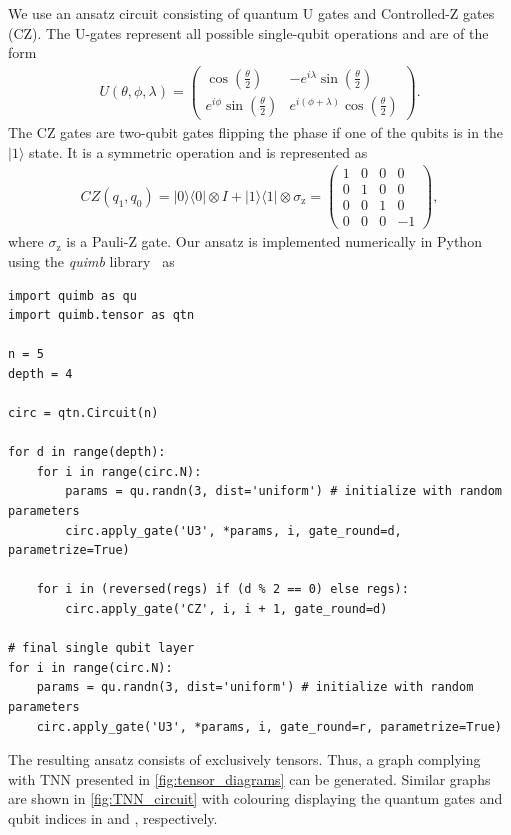 We use an ansatz circuit consisting of quantum U gates and Controlled-Z gates (CZ). The U-gates represent all possible single-qubit operations and are of the form
\begin{align}
    U(\theta, \phi, \lambda) =
            \begin{pmatrix}
                \cos\left(\frac{\theta}{2}\right)          & -e^{i\lambda}\sin\left(\frac{\theta}{2}\right) \\
                e^{i\phi}\sin\left(\frac{\theta}{2}\right) & e^{i(\phi+\lambda)}\cos\left(\frac{\theta}{2}\right)
            \end{pmatrix}
            .
\end{align}
The CZ gates are two-qubit gates flipping the phase if one of the qubits is in the $|1\rangle$ state. It is a symmetric operation and is represented as
\begin{align}
    CZ(q_1, q_0)=
        |0\rangle\langle 0| \otimes I + |1\rangle\langle 1| \otimes \sigma_\text{z} =
        \begin{pmatrix}
            1 & 0 & 0 & 0 \\
            0 & 1 & 0 & 0 \\
            0 & 0 & 1 & 0 \\
            0 & 0 & 0 & -1
        \end{pmatrix}
        ,
\end{align}
where $\sigma_\text{z}$ is a Pauli-Z gate.
Our ansatz is implemented numerically in Python using the \emph{quimb} library~\cite{Gray2018} as
\begin{verbatim}
import quimb as qu
import quimb.tensor as qtn

n = 5
depth = 4

circ = qtn.Circuit(n)

for d in range(depth):
    for i in range(circ.N):
        params = qu.randn(3, dist='uniform') # initialize with random parameters
        circ.apply_gate('U3', *params, i, gate_round=d, parametrize=True)

    for i in (reversed(regs) if (d % 2 == 0) else regs):
        circ.apply_gate('CZ', i, i + 1, gate_round=d)

# final single qubit layer
for i in range(circ.N):
    params = qu.randn(3, dist='uniform') # initialize with random parameters
    circ.apply_gate('U3', *params, i, gate_round=r, parametrize=True)
\end{verbatim}
The resulting ansatz consists of exclusively tensors. Thus, a graph complying with TNN presented in \cref{fig:tensor_diagrams} can be generated. Similar graphs are shown in \cref{fig:TNN_circuit} with colouring displaying the quantum gates and qubit indices in \protect{} and \protect{}, respectively.

